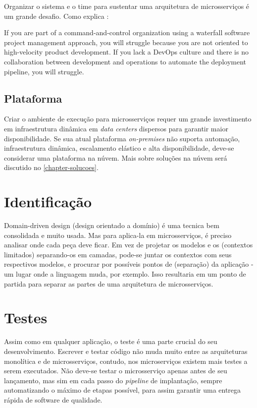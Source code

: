 Organizar o sistema e o time para sustentar uma arquitetura de microsserviços é um grande desafio. Como explica : 
\begin{citacao}
    If you are part of a command-and-control organization using a waterfall software project management approach, you will struggle because you are not oriented to high-velocity product development. If you lack a DevOps culture and there is no collaboration between development and operations to automate the deployment pipeline, you will struggle. \cite{Familiar2015}
\end{citacao}


\subsection{Plataforma}
Criar o ambiente de execução para microsserviços requer um grande investimento em infraestrutura dinâmica em \emph{data centers} dispersos para garantir maior disponibilidade. Se sua atual plataforma \emph{on-premises} não suporta automação, infraestrutura dinâmica, escalamento elástico e alta disponibilidade, deve-se considerar uma plataforma na núvem. Mais sobre soluções na núvem será discutido no \autoref{chapter-solucoes}.

\section{Identificação}

Domain-driven design (design orientado a domínio) é uma tecnica bem consolidada e muito usada. Mas para aplica-la em microsserviços, é preciso analisar onde cada peça deve ficar. Em vez de projetar os modelos e os (contextos limitados) separando-os em camadas, pode-se juntar os contextos com seus respectivos modelos, e procurar por possíveis pontos de (separação) da aplicação - um lugar onde a linguagem muda, por exemplo. Isso resultaria em um ponto de partida para separar as partes de uma arquitetura de microsserviços.

\section{Testes}

Assim como em qualquer aplicação, o teste é uma parte crucial do seu desenvolvimento. Escrever e testar código não muda muito entre as arquiteturas monolítica e de microsserviços, contudo, nos microserviços existem mais testes a serem executados. Não deve-se testar o microsserviço apenas antes de seu lançamento, mas sim em cada passo do \emph{pipeline} de implantação, sempre automatizando o máximo de etapas possível, para assim garantir uma entrega rápida de software de qualidade.

